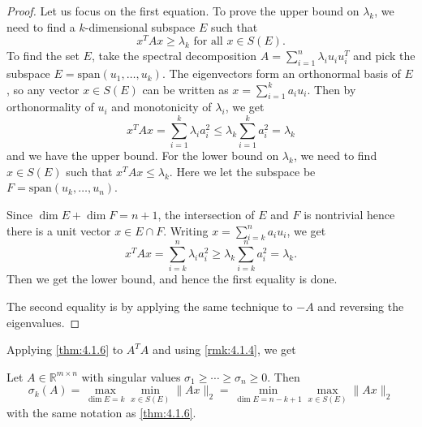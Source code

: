 \begin{proof}
Let us focus on the first equation. To prove the upper bound on $\lambda_k$, we need to find a $k$-dimensional 
subspace $E$ such that 
\[ x^T Ax \geq \lambda_k \text{ for all } x \in S(E). \]
To find the set $E$, take the spectral decomposition $A = \sum_{i = 1}^{n} \lambda_i u_i u_i^T$ and pick the 
subspace $E = \mathrm{span}(u_1, \dots, u_k)$. The eigenvectors form an orthonormal basis of $E$, so any vector 
$x \in S(E)$ can be written as $x = \sum_{i = 1}^{k} a_i u_i$. Then by orthonormality of $u_i$ and 
monotonicity of $\lambda_i$, we get 
\[ x^T Ax = \sum_{i = 1}^{k} \lambda_i a_i^2 \leq \lambda_k \sum_{i = 1}^{k} a_i^2 = \lambda_k \]
and we have the upper bound. For the lower bound on $\lambda_k$, we need to find $x \in S(E)$ such that 
$x^T Ax \leq \lambda_k$. Here we let the subspace be $F = \mathrm{span}(u_k, \dots, u_n)$. 

Since $\dim{E} + \dim{F} = n + 1$, the intersection of $E$ and $F$ is nontrivial hence there is a unit 
vector $x \in E \cap F$.  Writing $x = \sum_{i = k}^{n} a_i u_i$, we get 
\[ x^T Ax = \sum_{i = k}^{n} \lambda_i a_i^2 \geq \lambda_k \sum_{i = k}^{n} a_i^2 = \lambda_k. \]
Then we get the lower bound, and hence the first equality is done.

The second equality is by applying the same technique to $-A$ and reversing the eigenvalues.
\end{proof}

Applying \cref{thm:4.1.6} to $A^T A$ and using \cref{rmk:4.1.4}, we get 
\begin{corollary}
\label{cor:4.1.7}
Let $A \in \mathbb{R}^{m \times n}$ with singular values $\sigma_1 \geq \cdots \geq \sigma_n \geq 0$. Then 
\[ \sigma_k(A) = \max_{\dim{E} = k} \min_{x \in S(E)} \lVert Ax \rVert_{2} 
= \min_{\dim{E} = n-k+1} \max_{x \in S(E)} \lVert Ax \rVert_{2} \]
with the same notation as \cref{thm:4.1.6}.
\end{corollary}

